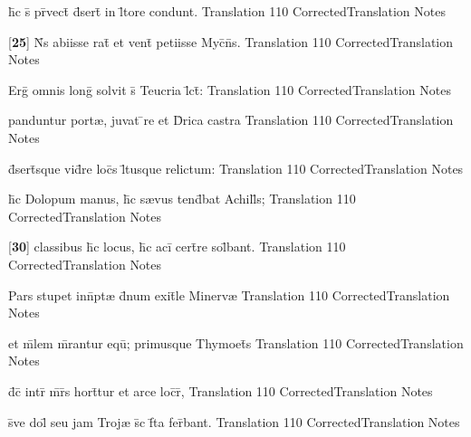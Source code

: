 \latline
  {h\={}c s\={} pr\={}vect\={\macron {\i}} d\={}sert\={} in l\={\macron {\i}}tore condunt.}
  { Translation }
  {110}
  { CorrectedTranslation }
  { Notes }


\latline
  {[\textbf{25}] N\={}s abiisse rat\={\macron {\i}} et vent\={} petiisse Myc\={}n\={}s.}
  { Translation }
  {110}
  { CorrectedTranslation }
  { Notes }


\latline
  {Erg\={} omnis long\={} solvit s\={} Teucria l\={}ct\={}:}
  { Translation }
  {110}
  { CorrectedTranslation }
  { Notes }


\latline
  {panduntur port{\ae}, juvat \={\macron {\i}}re et D\={}rica castra}
  { Translation }
  {110}
  { CorrectedTranslation }
  { Notes }


\latline
  {d\={}sert\={}sque vid\={}re loc\={}s l\={\macron {\i}}tusque relictum:}
  { Translation }
  {110}
  { CorrectedTranslation }
  { Notes }


\latline
  {h\={\macron {\i}}c Dolopum manus, h\={\macron {\i}}c s{\ae}vus tend\={}bat Achill\={}s;}
  { Translation }
  {110}
  { CorrectedTranslation }
  { Notes }


\latline
  {[\textbf{30}] classibus h\={\macron {\i}}c locus, h\={\macron {\i}}c aci\={} cert\={}re sol\={}bant.}
  { Translation }
  {110}
  { CorrectedTranslation }
  { Notes }


\latline
  {Pars stupet inn\={}pt{\ae} d\={}num exit\={}le Minerv{\ae}}
  { Translation }
  {110}
  { CorrectedTranslation }
  { Notes }


\latline
  {et m\={}lem m\={\macron {\i}}rantur equ\={\macron {\i}}; primusque Thymoet\={}s}
  { Translation }
  {110}
  { CorrectedTranslation }
  { Notes }


\latline
  {d\={}c\={\macron {\i}} intr\={} m\={}r\={}s hort\={}tur et arce loc\={}r\={\macron {\i}},}
  { Translation }
  {110}
  { CorrectedTranslation }
  { Notes }


\latline
  {s\={\macron {\i}}ve dol\={} seu jam Troj{\ae} s\={\macron {\i}}c f\={}ta fer\={}bant.}
  { Translation }
  {110}
  { CorrectedTranslation }
  { Notes }



